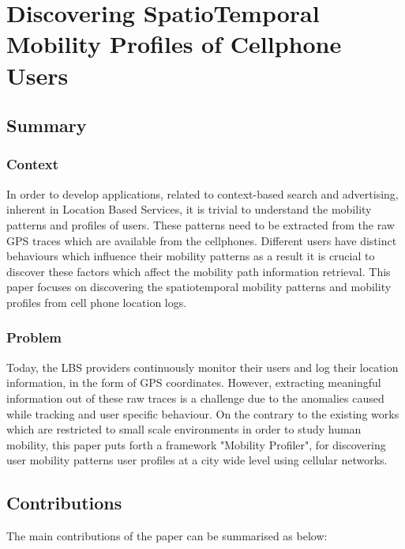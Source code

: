 \newpage
\section{Discovering SpatioTemporal Mobility Profiles of Cellphone Users~\cite{DBLP:conf/wowmom/BayirDE09}} \label{lect3}

\subsection*{Summary}

\subsubsection*{Context}

In order to develop applications, related to context-based search and advertising, inherent
in Location Based Services, it is trivial to understand the mobility patterns and profiles of
users. These patterns need to be extracted from the raw GPS traces which are available from the 
cellphones. Different users have distinct behaviours which influence their mobility patterns as 
a result it is crucial to discover these factors which affect the mobility path information
retrieval. This paper focuses on discovering the spatiotemporal mobility patterns and mobility
profiles from cell phone location logs.  
   

\subsubsection*{Problem}

Today, the LBS providers continuously monitor their users and log their location information, in 
the form of GPS coordinates. However, extracting meaningful information out of these raw traces is
a challenge due to the anomalies caused while tracking and user specific behaviour. On the 
contrary to the existing works which are restricted to small scale environments in order to 
study human mobility, this paper puts forth a framework "Mobility Profiler", for discovering user
mobility patterns user profiles at a city wide level using cellular networks.  

\subsection*{Contributions}

The main contributions of the paper can be summarised as below:


